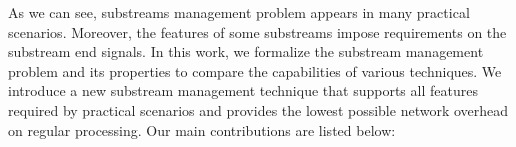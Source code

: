As we can see, substreams management problem appears in many practical scenarios. Moreover, the features of some substreams impose requirements on the substream end signals. In this work, we formalize the substream management problem and its properties to compare the capabilities of various techniques. We introduce a new substream management technique that supports all features required by practical scenarios and provides the lowest possible network overhead on regular processing. Our main contributions are listed below:






